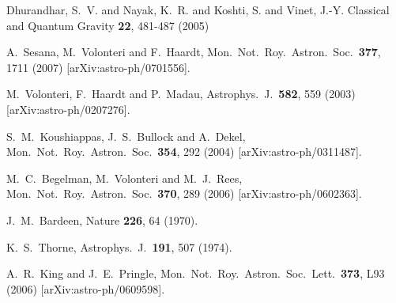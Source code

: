\documentclass{iopart}
\begin{document}
\begin{thebibliography}{}

{Dhurandhar}, S.~V. and {Nayak}, K.~R. and {Koshti}, S. and {Vinet}, J.-Y. Classical and Quantum Gravity {\bf 22}, 481-487 (2005)


  A.~Sesana, M.~Volonteri and F.~Haardt,
  Mon.\ Not.\ Roy.\ Astron.\ Soc.\  {\bf 377}, 1711 (2007)
  [arXiv:astro-ph/0701556].
 
  M.~Volonteri, F.~Haardt and P.~Madau,
  Astrophys.\ J.\  {\bf 582}, 559 (2003)
  [arXiv:astro-ph/0207276].



  S.~M.~Koushiappas, J.~S.~Bullock and A.~Dekel,
  Mon.\ Not.\ Roy.\ Astron.\ Soc.\  {\bf 354}, 292 (2004)
  [arXiv:astro-ph/0311487].

  M.~C.~Begelman, M.~Volonteri and M.~J.~Rees,
  Mon.\ Not.\ Roy.\ Astron.\ Soc.\  {\bf 370}, 289 (2006)
  [arXiv:astro-ph/0602363].

  J.~M.~Bardeen,
  Nature  {\bf 226}, 64 (1970).

  K.~S.~Thorne,
  Astrophys.\ J.\  {\bf 191}, 507 (1974).

  A.~R.~King and J.~E.~Pringle,
  Mon.\ Not.\ Roy.\ Astron.\ Soc.\ Lett.\  {\bf 373}, L93 (2006)
  [arXiv:astro-ph/0609598].


\end{thebibliography}
\end{document}
